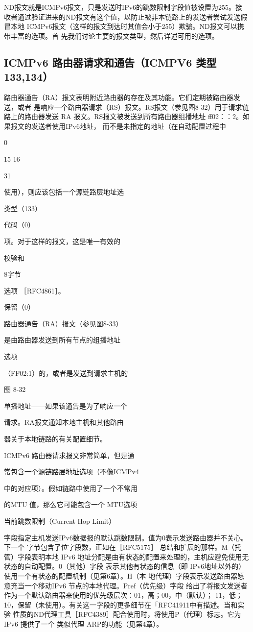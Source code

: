 ND报文就是ICMPv6报文，只是发送时IPv6的跳数限制字段值被设置为255。接
收者通过验证进来的ND报文有这个值，以防止被非本链路上的发送者尝试发送假冒本地
ICMPv6报文（这样的报文到达时其值会小于255）欺骗。ND报文可以携带丰富的选项。首
先我们讨论主要的报文类型，然后详述可用的选项。

\subsection{ICMPv6 路由器请求和通告（ICMPV6 类型 133,134）}
路由器通告（RA）报文表明附近路由器的存在及其功能。它们定期被路由器发送，或者
是响应一个路由器请求（RS）报文。RS报文（参见图8-32）用于请求链路上的路由器发送
RA 报文。RS报文被发送到所有路由器组播地址 ff02：：2。如果报文的发送者使用IPv6地址，
而不是未指定的地址（在自动配置过程中

0

15 16

31

使用），则应该包括一个源链路层地址选

类型（133）

代码（0）

项。对于这样的报文，这是唯一有效的

校验和

8字节

选项 ［RFC4861］。

保留（0）

路由器通告（RA）报文（参见图8-33）

是由路由器发送到所有节点的组播地址

选项

（FF02:1）的，或者是发送到请求主机的

图 8-32

单播地址——如果该通告是为了响应一个

请求。RA报文通知本地主机和其他路由

器关于本地链路的有关配置细节。

ICMPv6 路由器请求报文非常简单，但是通

常包含一个源链路层地址选项（不像ICMPv4

中的对应项）。假如链路中使用了一个不常用

的MTU 值，那么它可能包含一个 MTU选项

当前跳数限制（Current Hop Limit）

字段指定主机发送IPv6数据报的默认跳数限制。值为0表示发送路由器并不关心。下一个
字节包含了位字段数，正如在［RFC5175］ 总结和扩展的那样。M（托管）字段表明本地 IPv6
地址分配是由有状态的配置来处理的，主机应避免使用无状态的自动配置。0（其他）字段
表示其他有状态的信息（即 IPv6地址以外的）使用一个有状态的配置机制（见第6章）。H（本
地代理）字段表示发送路由器愿意充当一个移动IPv6 节点的本地代理。Pref（优先级）字段
给出了将报文发送者作为一个默认路由器来使用的优先级层次：01，高；00，中（默认）；
11，低；10，保留（未使用）。有关这一字段的更多细节在「RFC41911中有描述。当和实验
性质的ND代理工具［RFC4389］配合使用时，将使用P（代理）标志。它为IPv6 提供了一个
类似代理 ARP的功能（见第4章）。

